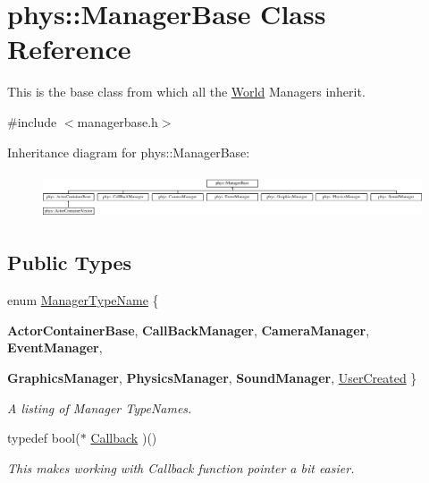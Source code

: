 \hypertarget{classphys_1_1ManagerBase}{
\section{phys::ManagerBase Class Reference}
\label{d2/de3/classphys_1_1ManagerBase}
}


This is the base class from which all the \hyperlink{classphys_1_1World}{World} Managers inherit.  




{\ttfamily \#include $<$managerbase.h$>$}

Inheritance diagram for phys::ManagerBase:\begin{figure}[H]
\begin{center}
\leavevmode
\includegraphics[height=1.35593cm]{d2/de3/classphys_1_1ManagerBase}
\end{center}
\end{figure}
\subsection*{Public Types}
\begin{DoxyCompactItemize}
\item 
enum \hyperlink{classphys_1_1ManagerBase_aaa6ccddf23892eaccb898529414f80a5}{ManagerTypeName} \{ \par
{\bfseries ActorContainerBase}, 
{\bfseries CallBackManager}, 
{\bfseries CameraManager}, 
{\bfseries EventManager}, 
\par
{\bfseries GraphicsManager}, 
{\bfseries PhysicsManager}, 
{\bfseries SoundManager}, 
\hyperlink{classphys_1_1ManagerBase_aaa6ccddf23892eaccb898529414f80a5a3239296e554feede76c4bcb6f824c66c}{UserCreated}
 \}
\begin{DoxyCompactList}\small\item\em A listing of Manager TypeNames. \item\end{DoxyCompactList}\item 
\hypertarget{classphys_1_1ManagerBase_a753f5f0127131529767beab2502f480b}{
typedef bool($\ast$ \hyperlink{classphys_1_1ManagerBase_a753f5f0127131529767beab2502f480b}{Callback} )()}
\label{d2/de3/classphys_1_1ManagerBase_a753f5f0127131529767beab2502f480b}

\begin{DoxyCompactList}\small\item\em This makes working with Callback function pointer a bit easier. \item\end{DoxyCompactList}\end{DoxyCompactItemize}
